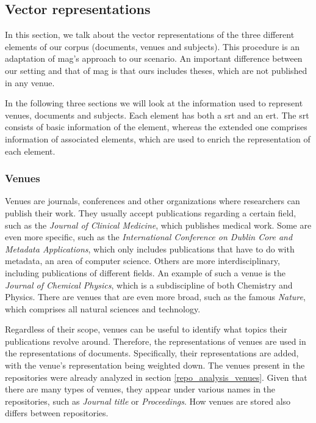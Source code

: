 \subsection{Vector representations} \label{unsupervised_approach_representations}

In this section, we talk about the vector representations of the three different elements of our corpus (documents, venues and subjects). This procedure is an adaptation of \acrshort{mag}'s approach \cite{shen2018web} to our scenario. An important difference between our setting and that of \acrshort{mag} is that ours includes theses, which are not published in any venue.

In the following three sections we will look at the information used to represent venues, documents and subjects. Each element has both a \acrfull{srt} and an \acrfull{ert}. The \acrshort{srt} consists of basic information of the element, whereas the extended one comprises information of associated elements, which are used to enrich the representation of each element.

\subsubsection{Venues}

Venues are journals, conferences and other organizations where researchers can publish their work. They usually accept publications regarding a certain field, such as the \textit{Journal of Clinical Medicine}, which publishes medical work. Some are even more specific, such as the \textit{International Conference on Dublin Core and Metadata Applications}, which only includes publications that have to do with metadata, an area of computer science. Others are more interdisciplinary, including publications of different fields. An example of such a venue is the \textit{Journal of Chemical Physics}, which is a subdiscipline of both Chemistry and Physics. There are venues that are even more broad, such as the famous \textit{Nature}, which comprises all natural sciences and technology.

Regardless of their scope, venues can be useful to identify what topics their publications revolve around. Therefore, the representations of venues are used in the representations of documents. Specifically, their representations are added, with the venue's representation being weighted down. The venues present in the repositories were already analyzed in section \ref{repo_analysis_venues}. Given that there are many types of venues, they appear under various names in the repositories, such as \textit{Journal title} or \textit{Proceedings}. How venues are stored also differs between repositories.

